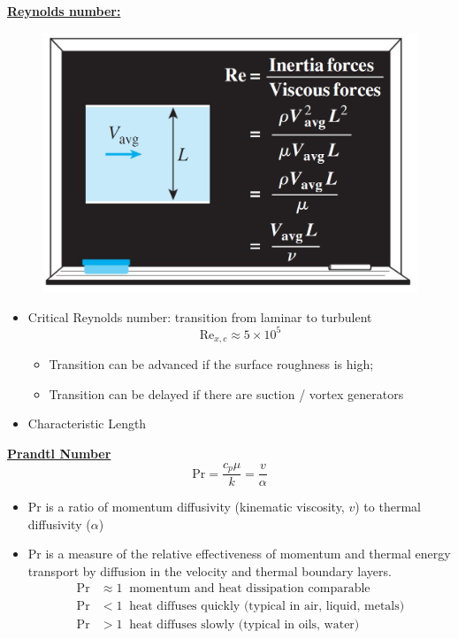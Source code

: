 \underline{\textbf{\large Reynolds number:}}
\begin{figure}[H]
    \centering
    \includegraphics[width=0.8\linewidth]{images/Renolds_Number.png}
\end{figure}
\begin{itemize}
    \item Critical Reynolds number: transition from laminar to turbulent
    \begin{equation*}
        \text{Re}_{x,c} \approx 5\times 10^5
    \end{equation*}
    \begin{itemize}
        \item Transition can \color{red} be advanced \color{black} if the surface roughness is high;
        \item Transition can \color{red} be delayed \color{black} if there are suction / vortex generators 
    \end{itemize}
    \item Characteristic Length
\end{itemize}
\textbf{\underline{Prandtl Number}}
\begin{equation*}
    \text{Pr} = \frac{c_p \mu}{k} = \frac{v}{\alpha}
\end{equation*}
\begin{itemize}
    \item \color{red}Pr \color{black} is a ratio of \color{blue} momentum diffusivity \color{black} (kinematic viscosity, $v$) to \color{blue} thermal diffusivity \color{black} ($\alpha$)
    \item \color{red} Pr \color{black} is a measure of the \color{blue} relative effectiveness of momentum \color{black} and \color{blue} thermal energy transport \color{black} by diffusion in the velocity and thermal boundary layers.
    \begin{align*}
        \text{Pr} &\approx 1 \; \; \text{momentum and heat dissipation comparable} \\
        \text{Pr} &< 1 \;\; \text{heat diffuses quickly (typical in air, liquid, metals)} \\
        \text{Pr} &> 1 \;\;\text{heat diffuses slowly (typical in oils, water)}
    \end{align*}
\end{itemize}
